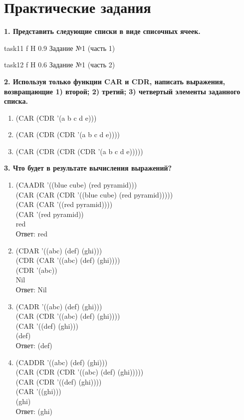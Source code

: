 \chapter{Практические задания}

\textbf{1. Представить следующие списки в виде списочных ячеек.}

{task11} %
{f} %
{H} %
{0.9\textwidth} %
{Задание №1 (часть 1)} %

{task12} %
{f} %
{H} %
{0.6\textwidth} %
{Задание №1 (часть 2)} %

\textbf{2. Используя только функции CAR и CDR, написать выражения, возвращающие 1) второй; 2) третий; 3) четвертый элементы заданного списка.}

\begin{enumerate}[label=\arabic*)]
	\item (CAR (CDR '(a b c d e)))
	\item (CAR (CDR (CDR '(a b c d e))))
	\item (CAR (CDR (CDR (CDR '(a b c d e)))))
\end{enumerate}

\textbf{3. Что будет в результате вычисления выражений?}
\begin{enumerate}[label=\alph*)]
	\item (CAADR '((blue cube) (red pyramid))) \\
	(CAR (CAR (CDR '((blue cube) (red pyramid)))))\\
	(CAR (CAR '((red pyramid))))\\
	(CAR '(red pyramid))\\
	red\\
	Ответ: red
	
	\item (CDAR '((abc) (def) (ghi)))\\
	(CDR (CAR '((abc) (def) (ghi))))\\
	(CDR '(abc))\\
	Nil\\
	Ответ: Nil
	
	\item (CADR '((abc) (def) (ghi)))\\
	(CAR (CDR '((abc) (def) (ghi))))\\
	(CAR '((def) (ghi)))\\
	(def)\\
	Ответ: (def)
	
	\item (CADDR '((abc) (def) (ghi)))\\
	(CAR (CDR (CDR '((abc) (def) (ghi)))))\\
	(CAR (CDR '((def) (ghi))))\\
	(CAR '((ghi)))\\
	(ghi)\\
	Ответ: (ghi)
\end{enumerate}

